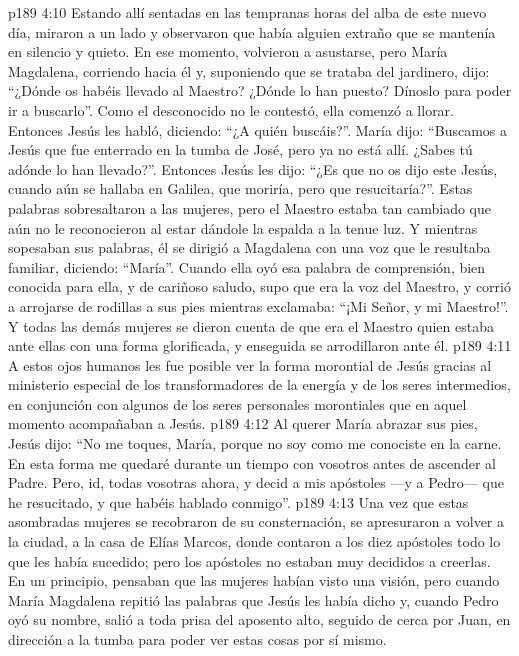 \vs p189 4:10 \pc Estando allí sentadas en las tempranas horas del alba de este nuevo día, miraron a un lado y observaron que había alguien extraño que se mantenía en silencio y quieto. En ese momento, volvieron a asustarse, pero María Magdalena, corriendo hacia él y, suponiendo que se trataba del jardinero, dijo: “¿Dónde os habéis llevado al Maestro? ¿Dónde lo han puesto? Dínoslo para poder ir a buscarlo”. Como el desconocido no le contestó, ella comenzó a llorar. Entonces Jesús les habló, diciendo: “¿A quién buscáis?”. María dijo: “Buscamos a Jesús que fue enterrado en la tumba de José, pero ya no está allí. ¿Sabes tú adónde lo han llevado?”. Entonces Jesús les dijo: “¿Es que no os dijo este Jesús, cuando aún se hallaba en Galilea, que moriría, pero que resucitaría?”. Estas palabras sobresaltaron a las mujeres, pero el Maestro estaba tan cambiado que aún no le reconocieron al estar dándole la espalda a la tenue luz. Y mientras sopesaban sus palabras, él se dirigió a Magdalena con una voz que le resultaba familiar, diciendo: “María”. Cuando ella oyó esa palabra de comprensión, bien conocida para ella, y de cariñoso saludo, supo que era la voz del Maestro, y corrió a arrojarse de rodillas a sus pies mientras exclamaba: “¡Mi Señor, y mi Maestro!”. Y todas las demás mujeres se dieron cuenta de que era el Maestro quien estaba ante ellas con una forma glorificada, y enseguida se arrodillaron ante él.
\vs p189 4:11 A estos ojos humanos les fue posible ver la forma morontial de Jesús gracias al ministerio especial de los transformadores de la energía y de los seres intermedios, en conjunción con algunos de los seres personales morontiales que en aquel momento acompañaban a Jesús.
\vs p189 4:12 \pc Al querer María abrazar sus pies, Jesús dijo: “No me toques, María, porque no soy como me conociste en la carne. En esta forma me quedaré durante un tiempo con vosotros antes de ascender al Padre. Pero, id, todas vosotras ahora, y decid a mis apóstoles ---y a Pedro--- que he resucitado, y que habéis hablado conmigo”.
\vs p189 4:13 Una vez que estas asombradas mujeres se recobraron de su consternación, se apresuraron a volver a la ciudad, a la casa de Elías Marcos, donde contaron a los diez apóstoles todo lo que les había sucedido; pero los apóstoles no estaban muy decididos a creerlas. En un principio, pensaban que las mujeres habían visto una visión, pero cuando María Magdalena repitió las palabras que Jesús les había dicho y, cuando Pedro oyó su nombre, salió a toda prisa del aposento alto, seguido de cerca por Juan, en dirección a la tumba para poder ver estas cosas por sí mismo.

